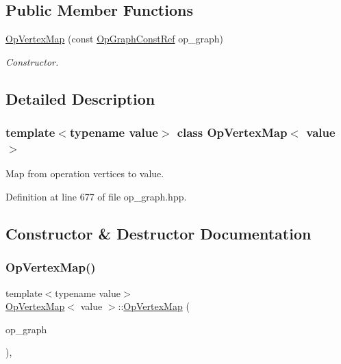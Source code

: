 \subsection*{Public Member Functions}
\begin{DoxyCompactItemize}
\item 
\hyperlink{classOpVertexMap_aae59441ea01c1613e7f999067888d50c}{Op\+Vertex\+Map} (const \hyperlink{op__graph_8hpp_a9a0b240622c47584bee6951a6f5de746}{Op\+Graph\+Const\+Ref} op\+\_\+graph)
\begin{DoxyCompactList}\small\item\em Constructor. \end{DoxyCompactList}\end{DoxyCompactItemize}


\subsection{Detailed Description}
\subsubsection*{template$<$typename value$>$\newline
class Op\+Vertex\+Map$<$ value $>$}

Map from operation vertices to value. 

Definition at line 677 of file op\+\_\+graph.\+hpp.



\subsection{Constructor \& Destructor Documentation}
\mbox{\label{classOpVertexMap_aae59441ea01c1613e7f999067888d50c}} 
\subsubsection{\texorpdfstring{Op\+Vertex\+Map()}{OpVertexMap()}}
{\footnotesize\ttfamily template$<$typename value$>$ \\
\hyperlink{classOpVertexMap}{Op\+Vertex\+Map}$<$ value $>$\+::\hyperlink{classOpVertexMap}{Op\+Vertex\+Map} (\begin{DoxyParamCaption}\item[{const \hyperlink{op__graph_8hpp_a9a0b240622c47584bee6951a6f5de746}{Op\+Graph\+Const\+Ref}}]{op\+\_\+graph }\end{DoxyParamCaption})\hspace{0.3cm}{\ttfamily [inline]}, {\ttfamily [explicit]}}



